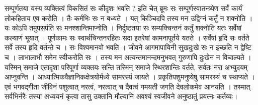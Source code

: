 {सम्पूर्णतया यस्य व्यक्तित्वं विकसितं सः कीदृशः भवति ? इति चेत् ब्रूमः सः सम्पूर्णस्वातन्त्र्येण सर्वं कार्यं लोकहिताय एव करोति । तैः कर्मभिः सः न बध्यते । यत् किञ्चिदपि तस्य मन उद्विग्नं कर्तुं न शक्नोति । यः कोऽपि तमुपसर्पति सः मनश्शान्तिमाप्नोति । निर्दुष्टतया सः सम्यक्चिन्तनं कर्तुं शक्नोति यतः सर्वेषां कल्याणं भूयात् । पूर्णकामः सः स्वार्थचिन्तनरहितः सदा इतरेषां कामनापूर्तये यतते । सर्वेषां हृदि सः वर्तते सर्वे तस्य हृदि वर्तन्ते च । सः विश्वमानवो भवति । जीवने आगमापायिनी सुखदुःखे सः न इच्छति न द्वेष्टि च । लाभालाभौ समेन स्वीकरोति सः । तस्य मन अत्यन्तमानन्दमनुभवत् गुरुणापि दुःखेन न विचाल्यते । यस्मिन् समाजे एतादृशा परिपूर्णा व्यक्तयः सन्ति तस्मिन् समाजे स्थिरशान्तिः वर्तते, सर्वतः नरा अभ्युदयम् आप्नुवन्ति । आध्यात्मिकवैज्ञानिकक्षेत्रयोर्मध्ये सामरस्यं जायते । प्रकृतिपशुमनुष्येषु सामरस्यं च स्थाप्यते । एवं भगवद्गीता जीविनं पशुत्वात् नरत्वं, नरत्वात् च दैवत्वं गमयती जगति देवलोकमेव आनयति । तस्मात् सर्वभिर्नरैः तस्या अध्ययनं कृत्वा तासु उक्तानि मौल्यानि अवश्यं स्वजीवने अनुष्ठातुं प्रयत्नः कर्तव्यः। 

\articleend
}
